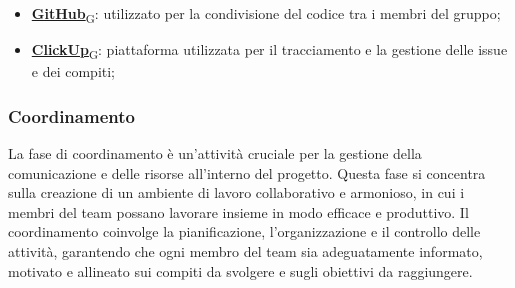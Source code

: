 \begin{itemize}
    \item \href{https://7last.github.io/docs/rtb/documentazione-interna/glossario\#github}{\textbf{GitHub}\textsubscript{G}}: utilizzato per la condivisione del codice tra i membri del gruppo;
    \item \href{https://7last.github.io/docs/rtb/documentazione-interna/glossario\#clickup}{\textbf{ClickUp}\textsubscript{G}}: piattaforma utilizzata per il tracciamento e la gestione delle issue e dei compiti;
\end{itemize}

\subsubsection{Coordinamento}
La fase di coordinamento è un'attività cruciale per la gestione della comunicazione e delle risorse all'interno del progetto. Questa fase si concentra sulla creazione di un ambiente di lavoro collaborativo e armonioso, in cui i membri del team possano lavorare insieme in modo efficace e produttivo. Il coordinamento coinvolge la pianificazione, l'organizzazione e il controllo delle attività, garantendo che ogni membro del team sia adeguatamente informato, motivato e allineato sui compiti da svolgere e sugli obiettivi da raggiungere. 

